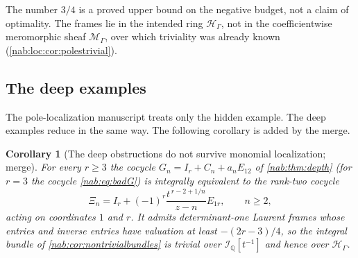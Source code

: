 \documentclass[11pt,letterpaper]{article}
\newtheorem{corollary}[corollary]{Corollary}
\theoremstyle{definition}
\theoremstyle{remark}
\newcommand{\Q}{\mathbb Q}
\newcommand{\HH}{\mathscr H_\Gamma}
\newcommand{\MM}{\mathscr M_\Gamma}
\numberwithin{equation}{section}
\begin{document}
The number $3/4$ is a proved upper bound on the negative budget, not a claim of
optimality. The frames lie in the intended ring $\HH$, not in the
coefficientwise meromorphic sheaf $\MM$, over which triviality was already
known (\cref{nab:loc:cor:polestrivial}).

\subsection{The deep examples}

The pole-localization manuscript treats only the hidden example. The deep
examples reduce in the same way. The following corollary is added by the
merge.

\begin{corollary}[The deep obstructions do not survive monomial localization;
merge]\label{nab:pl:cor:deep}
For every $r\geq3$ the cocycle $G_n=I_r+C_n+a_nE_{12}$ of
\cref{nab:thm:depth} (for $r=3$ the cocycle \eqref{nab:eq:badG}) is integrally
equivalent to the rank-two cocycle
\begin{equation}\label{nab:pl:eq:Xideep}
 \Xi_n=I_r+(-1)^r\frac{t^{\,r-2+1/n}}{z-n}E_{1r},\qquad n\geq2,
\end{equation}
acting on coordinates $1$ and $r$. It admits determinant-one Laurent frames
whose entries and inverse entries have valuation at least $-(2r-3)/4$, so the
integral bundle of \cref{nab:cor:nontrivialbundles} is trivial over
$\mathscr I_{\Q}[t^{-1}]$ and hence over $\HH$.
\end{corollary}
\end{document}
